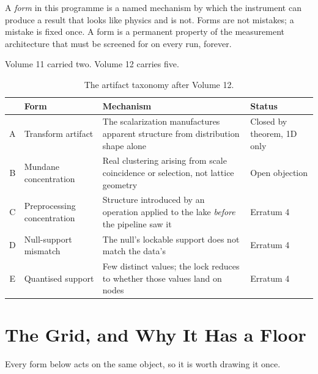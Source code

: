 \documentclass[11pt, letterpaper, openany]{book}
\begin{document}
A \emph{form} in this programme is a named mechanism by which the instrument can produce a
result that looks like physics and is not. Forms are not mistakes; a mistake is fixed once. A
form is a permanent property of the measurement architecture that must be screened for on every
run, forever.

Volume 11 carried two. Volume 12 carries five.

\begin{table}[H]
\centering
\small
\begin{tabular}{@{}clp{}l@{}}
\toprule
& \textbf{Form} & \textbf{Mechanism} & \textbf{Status} \\
\midrule
A & Transform artifact & The scalarization manufactures apparent structure from distribution shape alone & Closed by theorem, 1D only \\
B & Mundane concentration & Real clustering arising from scale coincidence or selection, not lattice geometry & Open objection \\
C & Preprocessing concentration & Structure introduced by an operation applied to the lake \emph{before} the pipeline saw it & Erratum 4 \\
D & Null-support mismatch & The null's lockable support does not match the data's & Erratum 4 \\
E & Quantised support & Few distinct values; the lock reduces to whether those values land on nodes & Erratum 4 \\
\bottomrule
\end{tabular}
\caption{The artifact taxonomy after Volume 12.}
\end{table}

\section{The Grid, and Why It Has a Floor}

Every form below acts on the same object, so it is worth drawing it once.
\end{document}
